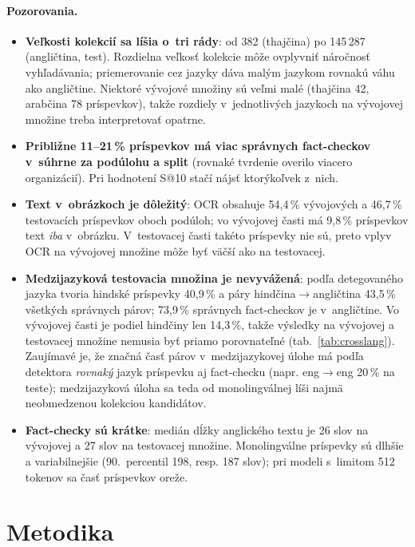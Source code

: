 \documentclass[11pt,a4paper]{article}
\makeatletter
\newcommand{\sat}{S@10}
\makeatother
\begin{document}
\paragraph{Pozorovania.}
\begin{itemize}
  \item \textbf{Veľkosti kolekcií sa líšia o~tri rády}: od 382 (thajčina) po 145\,287 (angličtina, test).
  Rozdielna veľkosť kolekcie môže ovplyvniť náročnosť vyhľadávania; priemerovanie cez jazyky dáva malým jazykom rovnakú váhu ako angličtine.
  Niektoré vývojové množiny sú veľmi malé (thajčina 42, arabčina 78 príspevkov), takže rozdiely v~jednotlivých jazykoch na vývojovej množine treba interpretovať opatrne.
  \item \textbf{Približne 11--21\,\% príspevkov má viac správnych fact-checkov v~súhrne za podúlohu a split} (rovnaké tvrdenie overilo viacero organizácií).
  Pri hodnotení \sat{} stačí nájsť ktorýkoľvek z~nich.
  \item \textbf{Text v~obrázkoch je dôležitý}: OCR obsahuje 54{,}4\,\% vývojových a 46{,}7\,\% testovacích príspevkov oboch podúloh; vo vývojovej časti má 9{,}8\,\% príspevkov text \emph{iba} v~obrázku.
  V~testovacej časti takéto príspevky nie sú, preto vplyv OCR na vývojovej množine môže byť väčší ako na testovacej.
  \item \textbf{Medzijazyková testovacia množina je nevyvážená}: podľa detegovaného jazyka tvoria hindské príspevky 40{,}9\,\% a páry hindčina$\to$angličtina 43{,}5\,\% všetkých správnych párov; 73{,}9\,\% správnych fact-checkov je v~angličtine.
  Vo vývojovej časti je podiel hindčiny len 14{,}3\,\%, takže výsledky na vývojovej a testovacej množine nemusia byť priamo porovnateľné (tab.~\ref{tab:crosslang}).
  Zaujímavé je, že značná časť párov v~medzijazykovej úlohe má podľa detektora \emph{rovnaký} jazyk príspevku aj fact-checku (napr. eng$\to$eng 20\,\% na teste); medzijazyková úloha sa teda od monolingválnej líši najmä neobmedzenou kolekciou kandidátov.
  \item \textbf{Fact-checky sú krátke}: medián dĺžky anglického textu je 26 slov na vývojovej a 27 slov na testovacej množine.
  Monolingválne príspevky sú dlhšie a variabilnejšie (90.~percentil 198, resp. 187 slov); pri modeli s~limitom 512 tokenov sa časť príspevkov oreže.
\end{itemize}

\section{Metodika}
\label{sec:method}
\end{document}
